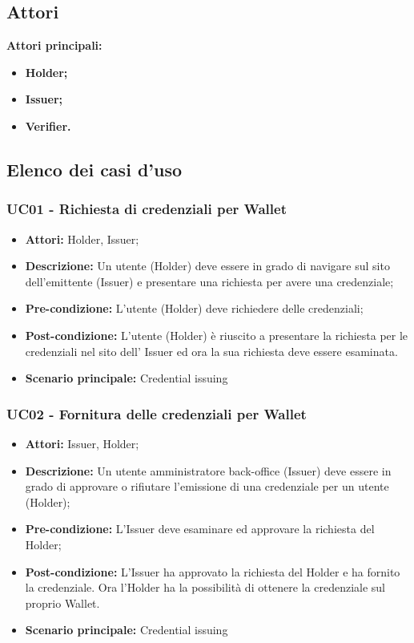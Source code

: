 \subsection{Attori}
\textbf{Attori principali:}
\begin{itemize}
    \item\textbf{Holder;}
    \item\textbf{Issuer;}
    \item\textbf{Verifier.}
\end{itemize}


\subsection{Elenco dei casi d'uso}
\subsubsection{UC01 - Richiesta di credenziali per Wallet}
\begin{itemize}
\item \textbf{Attori:} Holder, Issuer;
\item \textbf{Descrizione:} Un utente (Holder) deve essere in grado di navigare sul sito dell'emittente (Issuer) e presentare una richiesta per avere una credenziale;
\item \textbf{Pre-condizione:} L’utente (Holder) deve richiedere delle credenziali;
\item \textbf{Post-condizione:} L’utente (Holder) è riuscito a presentare la richiesta per le credenziali nel sito dell’ Issuer ed ora la sua richiesta deve essere esaminata.
\item \textbf{Scenario principale:} Credential issuing
\end{itemize}

\subsubsection{UC02 - Fornitura delle credenziali per Wallet}
\begin{itemize}
\item \textbf{Attori:} Issuer, Holder;
\item \textbf{Descrizione:} Un utente amministratore back-office (Issuer) deve essere in grado di approvare o rifiutare l'emissione di una credenziale per un utente (Holder);
\item \textbf{Pre-condizione:} L’Issuer deve esaminare ed approvare la richiesta del Holder;
\item \textbf{Post-condizione:} L’Issuer ha approvato la richiesta del Holder e ha fornito la credenziale. Ora l'Holder ha la possibilità di ottenere la credenziale sul proprio Wallet.
\item \textbf{Scenario principale:} Credential issuing
\end{itemize}

